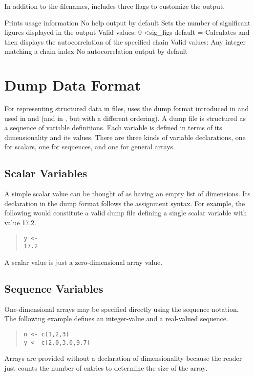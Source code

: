 In addition to the filenames,  includes three flags to customize the output.  

\begin{description}
{Prints usage information}
{No help output by default}
%
{Sets the number of significant figures displayed in the output}
{Valid values: 0 \textless sig\_figs}
{default =  }
%
{Calculates and then displays the autocorrelation of the specified chain}
{Valid values: Any integer matching a chain index}
{No autocorrelation output by default}
%
\end{description}

\chapter{Dump Data Format}\label{dump.chapter}

\noindent 
For representing structured data in files, \Stan uses the dump format
introduced in \SPLUS and used in \R and \JAGS (and in \BUGS, but with
a different ordering).   A dump file is structured as a sequence of
variable definitions.  Each variable is defined in terms of its
dimensionality and its values.   There are three kinds of variable
declarations, one for scalars, one for sequences, and one for general
arrays.

\section{Scalar Variables}

A simple scalar value can be thought of as having an empty list of
dimensions.  Its declaration in the dump format follows the \SPLUS
assignment syntax.  For example, the following would constitute a
valid dump file defining a single scalar variable  with value
17.2.
%
\begin{quote}
\begin{Verbatim}[fontsize=\small]
y <- 
17.2
\end{Verbatim}
\end{quote}
%
A scalar value is just a zero-dimensional array value.

\section{Sequence Variables}

One-dimensional arrays may be specified directly using the \SPLUS
sequence notation.  The following example defines an integer-value and
a real-valued sequence.
%
\begin{quote}
\begin{Verbatim}[fontsize=\small]
n <- c(1,2,3)
y <- c(2.0,3.0,9.7)
\end{Verbatim}
\end{quote}
%
Arrays are provided without a declaration of dimensionality because
the reader just counts the number of entries to determine the size of
the array.

